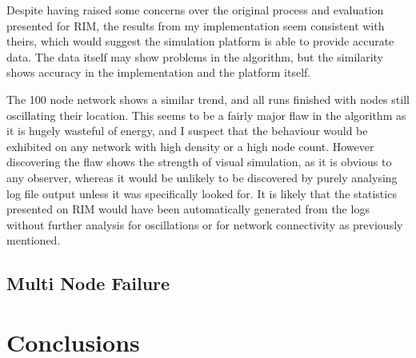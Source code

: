 \documentclass[authoryearcitations]{UoYCSproject}
\begin{document}
Despite having raised some concerns over the original process and evaluation presented for RIM, the results from my implementation seem consistent with theirs, which would suggest the simulation platform is able to provide accurate data. The data itself may show problems in the algorithm, but the similarity shows accuracy in the implementation and the platform itself.

The 100 node network shows a similar trend, and all runs finished with nodes still oscillating their location. This seems to be a fairly major flaw in the algorithm as it is hugely wasteful of energy, and I suspect that the behaviour would be exhibited on any network with high density or a high node count. However discovering the flaw shows the strength of visual simulation, as it is obvious to any observer, whereas it would be unlikely to be discovered by purely analysing log file output unless it was specifically looked for. It is likely that the statistics presented on RIM would have been automatically generated from the logs without further analysis for oscillations or for network connectivity as previously mentioned.

\section{Multi Node Failure}

\chapter{Conclusions}
\label{cha:Conclusion}





\end{document}
